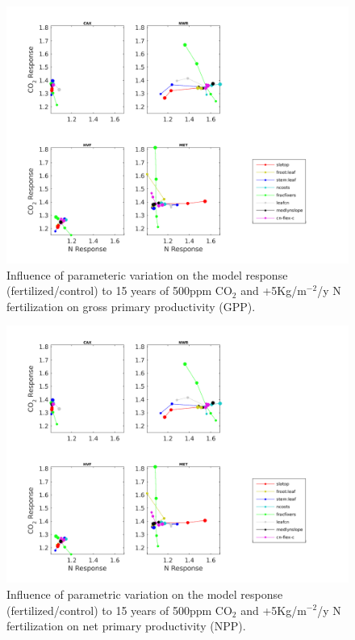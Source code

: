 \usepackage{}\documentclass[draft,linenumbers]{agujournal}
\begin{document}
 \begin{figure}[h]
     \includegraphics[width=1.35\textwidth]{matlab/figures/MAY19jp_relCNdep_defpft_GPP_y2013.png}
     \caption{Influence of parameteric variation on the model response (fertilized/control) to 15 years of 500ppm CO$_{2}$ and +5Kg/m$^{-2}$/y N fertilization on gross primary productivity (GPP). }
     \label{GPP_CN}
  \end{figure}
 
 \begin{figure}[h]
     \includegraphics[width=1.35\textwidth]{matlab/figures/MAY19jp_relCNdep_defpft_GPP_y2013.png}
     \caption{Influence of parametric variation on the model response (fertilized/control) to 15 years of 500ppm CO$_{2}$ and +5Kg/m$^{-2}$/y N fertilization on net primary productivity (NPP).}
     \label{NPP_CN}
  \end{figure}
 
\end{document}
